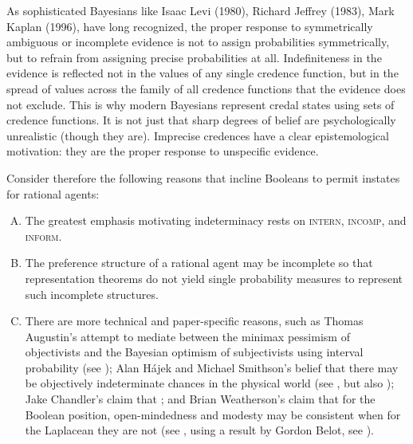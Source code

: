 \documentclass[11pt]{article}
\begin{document}
\begin{quotex}
  As sophisticated Bayesians like Isaac Levi (1980), Richard Jeffrey
  (1983), Mark Kaplan (1996), have long recognized, the proper
  response to symmetrically ambiguous or incomplete evidence is not to
  assign probabilities symmetrically, but to refrain from assigning
  precise probabilities at all. Indefiniteness in the evidence is
  reflected not in the values of any single credence function, but in
  the spread of values across the family of all credence functions
  that the evidence does not exclude. This is why modern Bayesians
  represent credal states using sets of credence functions. It is not
  just that sharp degrees of belief are psychologically unrealistic
  (though they are). Imprecise credences have a clear epistemological
  motivation: they are the proper response to unspecific evidence.
\end{quotex}

Consider therefore the following reasons that incline Booleans to
permit instates for rational agents:

\begin{enumerate}[(A)]
\item The greatest emphasis motivating indeterminacy rests on
  \textsc{intern}, \textsc{incomp}, and \textsc{inform}.
\item The preference structure of a rational agent may be incomplete
  so that representation theorems do not yield single probability
  measures to represent such incomplete
  structures.\label{page:houwieve}
\item There are more technical and paper-specific reasons, such as
  Thomas Augustin's attempt to mediate between the minimax pessimism
  of objectivists and the Bayesian optimism of subjectivists using
  interval probability (see ); Alan
  H{\'a}jek and Michael Smithson's belief that there may be
  objectively indeterminate chances in the physical world (see
  , but also ); Jake Chandler's claim that 
  ; and Brian Weatherson's claim that for the
  Boolean position, open-mindedness and modesty may be consistent when
  for the Laplacean they are not (see , using
  a result by Gordon Belot, see ).
\end{enumerate}
\end{document}
